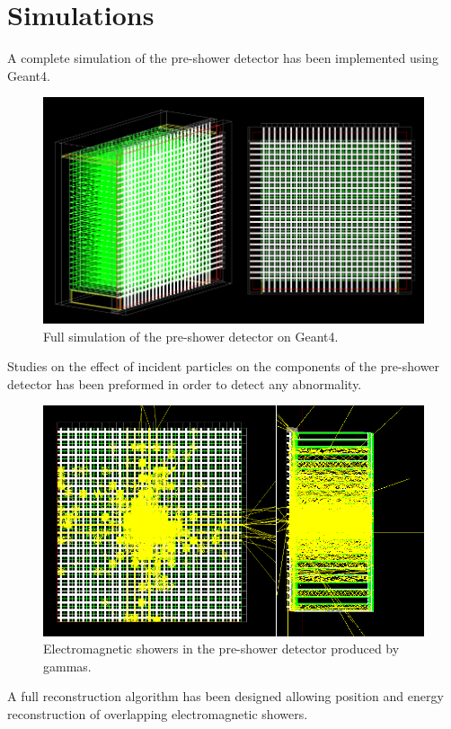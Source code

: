 \documentclass[final,5p,times,twocolumn]{elsarticle}
\begin{document}
\section{Simulations}
A complete simulation of the pre-shower detector has been implemented using Geant4.
\begin{figure}
\includegraphics[width=0.98\columnwidth,keepaspectratio]{geometry}
\caption{Full simulation of the pre-shower detector on Geant4.}
\end{figure}
%
Studies on the effect of incident particles on the components of the pre-shower detector has been preformed in order to detect any abnormality. 
%
\begin{figure}
\includegraphics[width=0.98\columnwidth,keepaspectratio]{showers}
\caption{Electromagnetic showers in the pre-shower detector produced by gammas.}
\end{figure}
%
A full reconstruction algorithm has been designed allowing position and energy reconstruction of overlapping electromagnetic showers.
%
\end{document}
